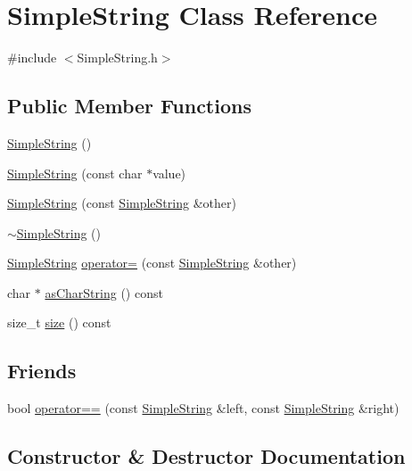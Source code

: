 \hypertarget{classSimpleString}{}\section{Simple\+String Class Reference}
\label{classSimpleString}


{\ttfamily \#include $<$Simple\+String.\+h$>$}

\subsection*{Public Member Functions}
\begin{DoxyCompactItemize}
\item 
\hyperlink{classSimpleString_a94e1722fc6da45b28cd470c2614d08e6}{Simple\+String} ()
\item 
\hyperlink{classSimpleString_a749a4a055fe40dd7e0009620b0c9e8bc}{Simple\+String} (const char $\ast$value)
\item 
\hyperlink{classSimpleString_a96550c7d7f17a68c435ab396c29e14f2}{Simple\+String} (const \hyperlink{classSimpleString}{Simple\+String} \&other)
\item 
\hyperlink{classSimpleString_ae2f848a10dd748f4494f6f06dc474140}{$\sim$\+Simple\+String} ()
\item 
\hyperlink{classSimpleString}{Simple\+String} \hyperlink{classSimpleString_afa8fe1222cc09b5ded23c8fc1f65b455}{operator=} (const \hyperlink{classSimpleString}{Simple\+String} \&other)
\item 
char $\ast$ \hyperlink{classSimpleString_a6ce7c3ff530988b2a5c7cdace529c2c2}{as\+Char\+String} () const 
\item 
size\+\_\+t \hyperlink{classSimpleString_a23f4e20c2f1991c825be3e476e032fa1}{size} () const 
\end{DoxyCompactItemize}
\subsection*{Friends}
\begin{DoxyCompactItemize}
\item 
bool \hyperlink{classSimpleString_a8bb3fb55107a2023bb828539fa6fe045}{operator==} (const \hyperlink{classSimpleString}{Simple\+String} \&left, const \hyperlink{classSimpleString}{Simple\+String} \&right)
\end{DoxyCompactItemize}


\subsection{Constructor \& Destructor Documentation}
\hypertarget{classSimpleString_a94e1722fc6da45b28cd470c2614d08e6}{}
